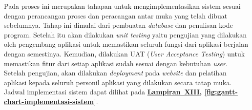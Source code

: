 Pada proses ini merupakan tahapan untuk mengimplementasikan sistem sesuai dengan perancangan proses dan peracangan antar muka yang telah dibuat sebelumnya. Tahap ini dimulai dari pembuatan \textit{database} dan penulisan kode program. Setelah itu akan dilakukan \textit{unit testing} yaitu pengujian yang dilakukan oleh pengembang aplikasi untuk memastikan seluruh fungsi dari aplikasi berjalan dengan semestinya. Kemudian, dilakukan UAT (\textit{User Acceptance Testing}) untuk memastikan fitur dari setiap aplikasi sudah sesuai dengan kebutuhan \textit{user}. Setelah pengujian, akan dilakukan \textit{deployment} pada \textit{website} dan pelatihan aplikasi kepada seluruh personil aplikasi yang dilakukan secara tatap muka. Jadwal implementasi sistem dapat dilihat pada \textbf{\hyperref[sec:gantt-chart-implementasi-sistem]{Lampiran~XIII}, \ref{fig:gantt-chart-implementasi-sistem}}.